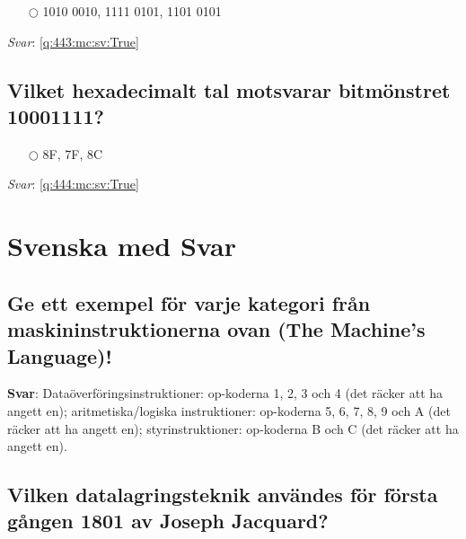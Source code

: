 \documentclass[a4paper,11pt,oneside]{article}
\begin{document}
\begin{sloppypar}
\label{q:443:mc:sv:False}

\begin{itemize}
  \item[$\bigcirc$] 1010 0010, 1111 0101, 1101 0101
\end{itemize}

\vspace{1cm}

\textit{Svar}: \autoref{q:443:mc:sv:True}



\subsection{Vilket hexadecimalt tal motsvarar bitm\"onstret 10001111?}

\label{q:444:mc:sv:False}

\begin{itemize}
  \item[$\bigcirc$] 8F, 7F, 8C
\end{itemize}

\vspace{1cm}

\textit{Svar}: \autoref{q:444:mc:sv:True}

\section{Svenska med Svar}
\label{svenska}

\subsection{Ge ett exempel f\"or varje kategori fr\r{a}n maskininstruktionerna ovan (The Machine{\textquoteright}s Language)!}

\label{q:1:sa:sv:True}

\textbf{Svar}: Data\"overf\"oringsinstruktioner: op-koderna 1, 2, 3 och 4 (det r\"acker att ha angett en); aritmetiska/logiska instruktioner: op-koderna 5, 6, 7, 8, 9 och A (det r\"acker att ha angett en); styrinstruktioner: op-koderna B och C (det r\"acker att ha angett en).



\subsection{Vilken datalagringsteknik anv\"andes f\"or f\"orsta g\r{a}ngen 1801 av Joseph Jacquard?}

\label{q:3:sa:sv:True}


\end{sloppypar}
\end{document}
